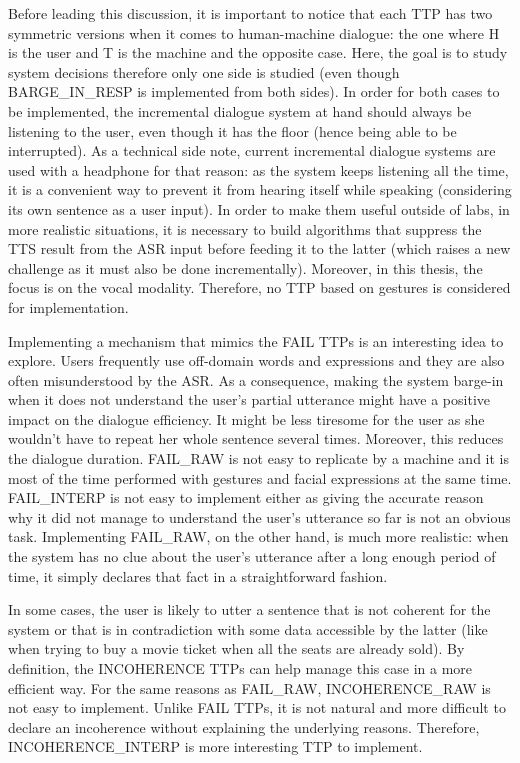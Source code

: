 				Before leading this discussion, it is important to notice that each TTP has two symmetric versions when it comes to human-machine dialogue: the one where H is the user and T is the machine and the opposite case. Here, the goal is to study system decisions therefore only one side is studied (even though BARGE\_IN\_RESP is implemented from both sides). In order for both cases to be implemented, the incremental dialogue system at hand should always be listening to the user, even though it has the floor (hence being able to be interrupted). As a technical side note, current incremental dialogue systems are used with a headphone for that reason: as the system keeps listening all the time, it is a convenient way to prevent it from hearing itself while speaking (considering its own sentence as a user input). In order to make them useful outside of labs, in more realistic situations, it is necessary to build algorithms that suppress the TTS result from the ASR input before feeding it to the latter (which raises a new challenge as it must also be done incrementally). Moreover, in this thesis, the focus is on the vocal modality. Therefore, no TTP based on gestures is considered for implementation.

				Implementing a mechanism that mimics the FAIL TTPs is an interesting idea to explore. Users frequently use off-domain words and expressions \cite{Ghigi2014} and they are also often misunderstood by the ASR. As a consequence, making the system barge-in when it does not understand the user's partial utterance might have a positive impact on the dialogue efficiency. It might be less tiresome for the user as she wouldn't have to repeat her whole sentence several times. Moreover, this reduces the dialogue duration. FAIL\_RAW is not easy to replicate by a machine and it is most of the time performed with gestures and facial expressions at the same time. FAIL\_INTERP is not easy to implement either as giving the accurate reason why it did not manage to understand the user's utterance so far is not an obvious task. Implementing FAIL\_RAW, on the other hand, is much more realistic: when the system has no clue about the user's utterance after a long enough period of time, it simply declares that fact in a straightforward fashion.

				In some cases, the user is likely to utter a sentence that is not coherent for the system or that is in contradiction with some data accessible by the latter (like when trying to buy a movie ticket when all the seats are already sold). By definition, the INCOHERENCE TTPs can help manage this case in a more efficient way. For the same reasons as FAIL\_RAW, INCOHERENCE\_RAW is not easy to implement. Unlike FAIL TTPs, it is not natural and more difficult to declare an incoherence without explaining the underlying reasons. Therefore, INCOHERENCE\_INTERP is more interesting TTP to implement.

